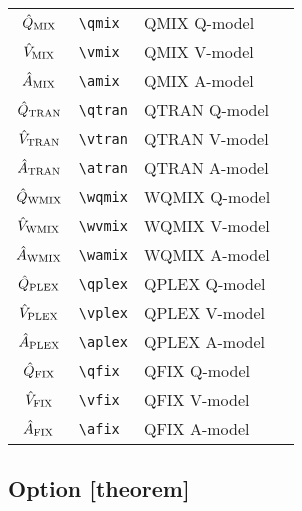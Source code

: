 \documentclass{article}
\begin{document}
\begin{tabular}{clll}
  \midrule
  $\hat Q_{\operatorname{MIX}}$ & \verb|\qmix| & QMIX Q-model \\
  $\hat V_{\operatorname{MIX}}$ & \verb|\vmix| & QMIX V-model \\
  $\hat A_{\operatorname{MIX}}$ & \verb|\amix| & QMIX A-model \\
  \midrule
  $\hat Q_{\operatorname{TRAN}}$ & \verb|\qtran| & QTRAN Q-model \\
  $\hat V_{\operatorname{TRAN}}$ & \verb|\vtran| & QTRAN V-model \\
  $\hat A_{\operatorname{TRAN}}$ & \verb|\atran| & QTRAN A-model \\
  \midrule
  $\hat Q_{\operatorname{WMIX}}$ & \verb|\wqmix| & WQMIX Q-model \\
  $\hat V_{\operatorname{WMIX}}$ & \verb|\wvmix| & WQMIX V-model \\
  $\hat A_{\operatorname{WMIX}}$ & \verb|\wamix| & WQMIX A-model \\
  \midrule
  $\hat Q_{\operatorname{PLEX}}$ & \verb|\qplex| & QPLEX Q-model \\
  $\hat V_{\operatorname{PLEX}}$ & \verb|\vplex| & QPLEX V-model \\
  $\hat A_{\operatorname{PLEX}}$ & \verb|\aplex| & QPLEX A-model \\
  \midrule
  $\hat Q_{\operatorname{FIX}}$ & \verb|\qfix| & QFIX Q-model \\
  $\hat V_{\operatorname{FIX}}$ & \verb|\vfix| & QFIX V-model \\
  $\hat A_{\operatorname{FIX}}$ & \verb|\afix| & QFIX A-model \\
  \bottomrule
\end{tabular}

\subsection*{Option [theorem]}
\end{document}
